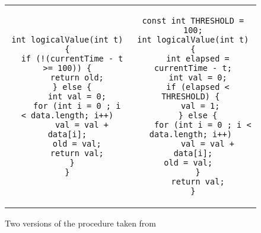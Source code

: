 \begin{figure*}
\centering
\begin{tabular}{cc}
\begin{lstlisting}
int logicalValue(int t) {
  if (!(currentTime - t >= 100)) {
    return old;
  } else {
    int val = 0;
    for (int i = 0 ; i < data.length; i++)
      val = val + data[i];
    old = val;
    return val;
  }
}
\end{lstlisting}
&
\begin{lstlisting}
const int THRESHOLD = 100;
int logicalValue(int t) {
  int elapsed = currentTime - t;
  int val = 0;
  if (elapsed < THRESHOLD) { 
    val = 1; 
  } else {
    for (int i = 0 ; i < data.length; i++) 
      val = val + data[i];
    old = val;      
  }
  return val;
}
\end{lstlisting}
\end{tabular}
\caption{Two versions of the  procedure taken from~\cite{DEP:FSE08}}
\end{figure*} 